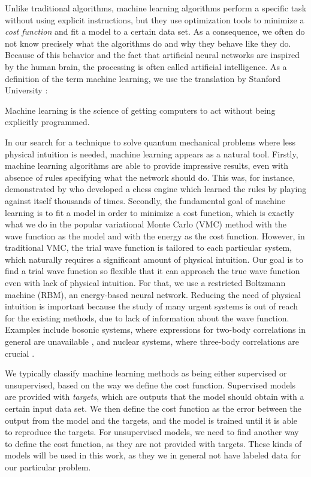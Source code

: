 Unlike traditional algorithms, machine learning algorithms perform a specific task without using explicit instructions, but they use optimization tools to minimize a \textit{cost function} and fit a model to a certain data set. As a consequence, we often do not know precisely what the algorithms do and why they behave like they do. Because of this behavior and the fact that artificial neural networks are inspired by the human brain, the processing is often called artificial intelligence. As a definition of the term machine learning, we use the translation by Stanford University \supercite{noauthor_machine_nodate}:

\begin{shadequote}{}
	Machine learning is the science of getting computers to act without being explicitly programmed.
\end{shadequote}

In our search for a technique to solve quantum mechanical problems where less physical intuition is needed, machine learning appears as a natural tool. Firstly, machine learning algorithms are able to provide impressive results, even with absence of rules specifying what the network should do. This was, for instance, demonstrated by \citet{silver2017mastering} who developed a chess engine which learned the rules by playing against itself thousands of times. Secondly, the fundamental goal of machine learning is to fit a model in order to minimize a cost function, which is exactly what we do in the popular variational Monte Carlo (VMC) method with the wave function as the model and with the energy as the cost function. However, in traditional VMC, the trial wave function is tailored to each particular system, which naturally requires a significant amount of physical intuition. Our goal is to find a trial wave function so flexible that it can approach the true wave function even with lack of physical intuition. For that, we use a restricted Boltzmann machine (RBM), an energy-based neural network. Reducing the need of physical intuition is important because the study of many urgent systems is out of reach for the existing methods, due to lack of information about the wave function. Examples include bosonic systems, where expressions for two-body correlations in general are unavailable \supercite{holzmann_pair_1999}, and nuclear systems, where three-body correlations are crucial \supercite{sauer_three-nucleon_2014}.

We typically classify machine learning methods as being either supervised or unsupervised, based on the way we define the cost function. Supervised models are provided with \textit{targets}, which are outputs that the model should obtain with a certain input data set. We then define the cost function as the error between the output from the model and the targets, and the model is trained until it is able to reproduce the targets. For unsupervised models, we need to find another way to define the cost function, as they are not provided with targets. These kinds of models will be used in this work, as they we in general not have labeled data for our particular problem.


